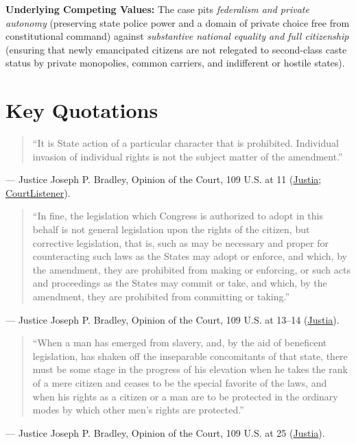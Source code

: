 \documentclass[12pt]{article}
\begin{document}
\textbf{Underlying Competing Values:} The case pits \textit{federalism and private autonomy} (preserving state police power and a domain of private choice free from constitutional command) against \textit{substantive national equality and full citizenship} (ensuring that newly emancipated citizens are not relegated to second-class caste status by private monopolies, common carriers, and indifferent or hostile states).

\section{Key Quotations}

\begin{quote}
``It is State action of a particular character that is prohibited. Individual invasion of individual rights is not the subject matter of the amendment.''
\end{quote}
\noindent --- Justice Joseph P. Bradley, Opinion of the Court, 109 U.S. at 11 (\href{https://supreme.justia.com/cases/federal/us/109/3/}{Justia}; \href{https://www.courtlistener.com/opinion/90897/civil-rights-cases/}{CourtListener}).

\begin{quote}
``In fine, the legislation which Congress is authorized to adopt in this behalf is not general legislation upon the rights of the citizen, but corrective legislation, that is, such as may be necessary and proper for counteracting such laws as the States may adopt or enforce, and which, by the amendment, they are prohibited from making or enforcing, or such acts and proceedings as the States may commit or take, and which, by the amendment, they are prohibited from committing or taking.''
\end{quote}
\noindent --- Justice Joseph P. Bradley, Opinion of the Court, 109 U.S. at 13--14 (\href{https://supreme.justia.com/cases/federal/us/109/3/}{Justia}).

\begin{quote}
``When a man has emerged from slavery, and, by the aid of beneficent legislation, has shaken off the inseparable concomitants of that state, there must be some stage in the progress of his elevation when he takes the rank of a mere citizen and ceases to be the special favorite of the laws, and when his rights as a citizen or a man are to be protected in the ordinary modes by which other men's rights are protected.''
\end{quote}
\noindent --- Justice Joseph P. Bradley, Opinion of the Court, 109 U.S. at 25 (\href{https://supreme.justia.com/cases/federal/us/109/3/}{Justia}).
\end{document}
